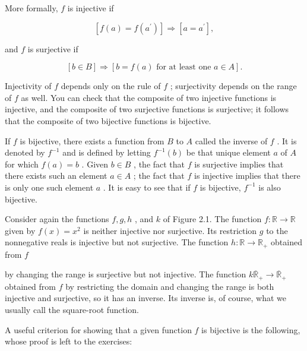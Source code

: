 More formally, \(f\) is injective if

\[
\left\lbrack  {f\left( a\right)  = f\left( {a}^{\prime }\right) }\right\rbrack \Rightarrow  \left\lbrack  {a = {a}^{\prime }}\right\rbrack  ,
\]

and \(f\) is surjective if

\[
\left\lbrack  {b \in  B}\right\rbrack \Rightarrow  \left\lbrack  {b = f\left( a\right) \text{ for at least one }a \in  A}\right\rbrack  .
\]

Injectivity of \(f\) depends only on the rule of \(f\) ; surjectivity depends on the range of \(f\) as well. You can check that the composite of two injective functions is injective, and the composite of two surjective functions is surjective; it follows that the composite of two bijective functions is bijective.

If \(f\) is bijective, there exists a function from \(B\) to \(A\) called the inverse of \(f\) . It is denoted by \({f}^{-1}\) and is defined by letting \({f}^{-1}\left( b\right)\) be that unique element \(a\) of \(A\) for which \(f\left( a\right)  = b\) . Given \(b \in  B\) , the fact that \(f\) is surjective implies that there exists such an element \(a \in  A\) ; the fact that \(f\) is injective implies that there is only one such element \(a\) . It is easy to see that if \(f\) is bijective, \({f}^{-1}\) is also bijective.

\begin{centeredblock}
\begin{example} Consider again the functions \(f,g,h\) , and \(k\) of Figure 2.1. The function \(f : \mathbb{R} \rightarrow  \mathbb{R}\) given by \(f\left( x\right)  = {x}^{2}\) is neither injective nor surjective. Its restriction \(g\) to the nonnegative reals is injective but not surjective. The function \(h : \mathbb{R} \rightarrow  {\mathbb{R}}_{ + }\) obtained from \(f\)

by changing the range is surjective but not injective. The function \(k{\overline{\mathbb{R}}}_{ + } \rightarrow  {\overline{\mathbb{R}}}_{ + }\) obtained from \(f\) by restricting the domain and changing the range is both injective and surjective, so it has an inverse. Its inverse is, of course, what we usually call the square-root function.
\end{example}
\end{centeredblock}

A useful criterion for showing that a given function \(f\) is bijective is the following, whose proof is left to the exercises:

